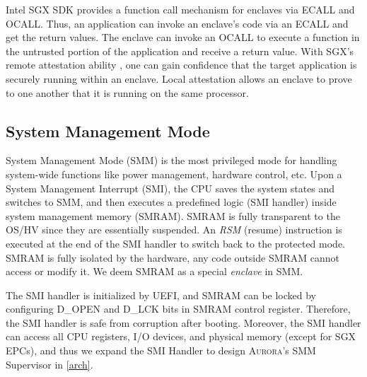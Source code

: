 Intel SGX SDK provides a function call mechanism for enclaves via ECALL and OCALL.  Thus, an application can invoke an enclave's code via an ECALL and get the return values. The enclave can invoke an OCALL to execute a function in the untrusted portion of the application and receive a return value. With SGX's remote attestation ability \cite{Anati2013InnovativeTF}, one can gain confidence that the target application is securely running within an enclave. Local attestation allows an enclave to prove to one another that it is running on the same processor. %

\subsection{System Management Mode}
System Management Mode (SMM) is the most privileged mode for handling system-wide functions like power management, hardware control, etc. Upon a System Management Interrupt (SMI), the CPU saves the system states and switches to SMM, and then executes a predefined logic (SMI handler) inside system management memory (SMRAM). SMRAM is fully transparent to the OS/HV since they are essentially suspended. An \textit{RSM} (resume) instruction is executed at the end of the SMI handler to switch back to the protected mode.  SMRAM is fully isolated by the hardware, any code outside SMRAM cannot access or modify it. We deem SMRAM as a special \textit{enclave} in SMM. %

The SMI handler is initialized by UEFI, and  SMRAM can be locked by configuring D\_OPEN and D\_LCK bits in SMRAM control register. Therefore, the SMI handler is safe from corruption after booting. Moreover, the SMI handler can access all CPU registers, I/O devices, and physical memory (except for SGX EPCs), and thus we expand the SMI Handler to design \textsc{Aurora}'s SMM Supervisor in \autoref{arch}.

